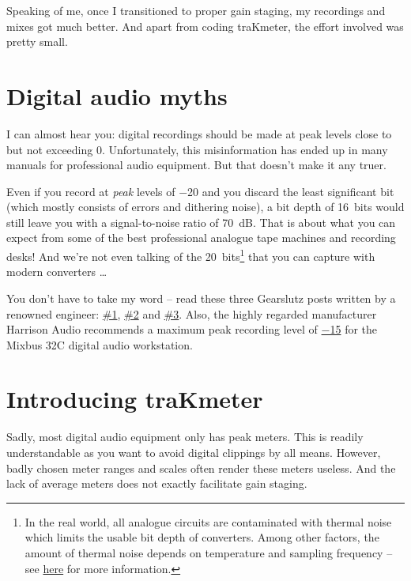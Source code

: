 Speaking of me, once I transitioned to proper gain staging, my
recordings and mixes got much better.  And apart from coding
traKmeter, the effort involved was pretty small.

\section{Digital audio myths}
\label{sec:digital_audio_myths}

I can almost hear you: digital recordings should be made at peak
levels close to but not exceeding \SI{0}{\dBFS}.  Unfortunately, this
misinformation has ended up in many manuals for professional audio
equipment.  But that doesn't make it any truer.

Even if you record at \emph{peak} levels of \SI{-20}{\dBFS} and you
discard the least significant bit (which mostly consists of errors and
dithering noise), a bit depth of \SI{16}{bits} would still leave you
with a signal-to-noise ratio of \SI{70}{\dB}.  That is about what you
can expect from some of the best professional analogue tape machines
and recording desks!  And we're not even talking of the
\SI{20}{bits}\footnote{In the real world, all analogue circuits are
  contaminated with thermal noise which limits the usable bit depth of
  converters.  Among other factors, the amount of thermal noise
  depends on temperature and sampling frequency -- see
  \href{http://www.sengpielaudio.com/calculator-noise.htm}{here} for
  more information.}  that you can capture with modern converters
\dots

You don't have to take my word -- read these three Gearslutz posts
written by a renowned engineer:
\href{https://www.gearslutz.com/board/showpost.php?p=10739624&postcount=9}{\#1},
\href{https://www.gearslutz.com/board/showpost.php?p=5063154&postcount=219}{\#2}
and
\href{https://www.gearslutz.com/board/showpost.php?p=9909382&postcount=96}{\#3}.
Also, the highly regarded manufacturer Harrison Audio recommends a
maximum peak recording level of
\href{http://www.harrisonconsoles.com/mixbus/mixbus32c-4-live-manual/1/en/topic/gain-staging}{\SI{-15}{\dBFS}}
for the Mixbus 32C digital audio workstation.

\section{Introducing traKmeter}
\label{sec:introducing_trakmeter}

Sadly, most digital audio equipment only has peak meters.  This is
readily understandable as you want to avoid digital clippings by all
means.  However, badly chosen meter ranges and scales often render
these meters useless.  And the lack of average meters does not exactly
facilitate gain staging.

